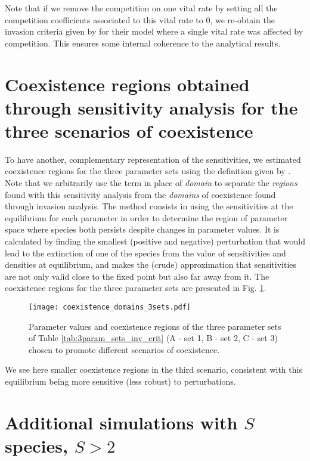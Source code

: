 \documentclass{article}
\begin{document}
Note that if we remove the competition on one vital rate by setting all the competition coefficients associated to this vital rate to 0, we re-obtain the invasion criteria given by \citet{fujiwara2011coexistence} for their model where a single vital rate was affected by competition. This ensures some internal coherence to the analytical results. 

\section{Coexistence regions obtained through sensitivity analysis for the three scenarios of coexistence}\label{app:coex_regions}

To have another, complementary representation of the sensitivities, we estimated coexistence regions for the three parameter sets using the definition given by \citet{barabas2014sensitivity}. Note that we arbitrarily use the term  in place of \textit{domain} to separate the \textit{regions} found with this sensitivity analysis from the \textit{domains} of coexistence found through invasion analysis. 
The method consists in using the sensitivities at the equilibrium for each parameter in order to determine the region of parameter space where species both persists despite changes in parameter values. It is calculated by finding the smallest (positive and negative) perturbation that would lead to the extinction of one of the species from the value of sensitivities and densities at equilibrium, and makes the (crude) approximation that sensitivities are not only valid close to the fixed point but also far away from it.
The coexistence regions for the three parameter sets are presented in Fig. \ref{fig:coexistence_regions_3sets}.

\begin{figure}[H]
    \centering
    \texttt{[image: coexistence\_domains\_3sets.pdf]}
    \caption{Parameter values and coexistence regions of the three parameter sets of Table \ref{tab:3param_sets_inv_crit} (A - set 1, B - set 2, C - set 3) chosen to promote different scenarios of coexistence.}
    \label{fig:coexistence_regions_3sets}
\end{figure}

We see here smaller coexistence regions in the third scenario, consistent with this equilibrium being more sensitive (less robust) to perturbations. 


\section{Additional simulations with $S$ species, $S>2$}\label{app:S_species_simus}
\end{document}
